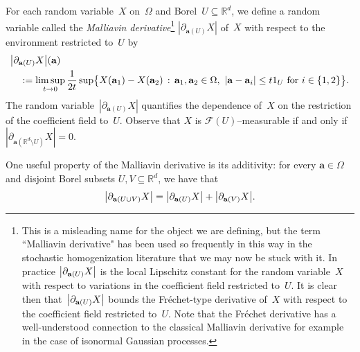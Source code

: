 \documentclass[11pt]{article} %
\numberwithin{equation}{section}
\theoremstyle{definition}
\let\originalleft\left
\let\originalright\right
\renewcommand{\left}{\mathopen{}\mathclose\bgroup\originalleft}
\renewcommand{\right}{\aftergroup\egroup\originalright}
\newcommand*{\Rd}{\ensuremath{\mathbb{R}^d}}
\renewcommand{\a}{\mathbf{a}}
\newcommand{\F}{\mathcal{F}}
\newcommand{\indc}{1}
\begin{document}
For each random variable~$X$ on~$\Omega$ and Borel~$U\subseteq\Rd$, we define a random variable called the \emph{Malliavin derivative}\footnote{This is a misleading name for the object we are defining, but the term ``Malliavin derivative" has been used so frequently in this way in the stochastic homogenization literature that we may now be stuck with it. In practice $\left| \partial_{\a(U)} X \right|$ is the local Lipschitz constant for the random variable~$X$ with respect to variations in the coefficient field restricted to~$U$. It is clear then that~$\left| \partial_{\a(U)} X \right|$ bounds the Fr\'echet-type derivative of~$X$ with respect to the coefficient field restricted to~$U$. Note that the Fr\'echet derivative has a well-understood connection to the classical Malliavin derivative for example in the case of isonormal Gaussian processes.}  
$|\partial_{\a(U)} X|$ of~$X$ with respect to the environment restricted to~$U$ by 
\begin{align} 
\label{e.Mall}
\lefteqn{
\left| \partial_{\a(U)} X\right| (\a) 
} \quad & 
\notag \\ & 
:=
\limsup_{t\to 0} 
\frac1{2t} 
\sup
\bigl\{ X(\a_1) - X(\a_2) 
\,:\,
\a_1,\a_2 \in\Omega, \ \left| \a - \a_i \right| \leq t \indc_{U} \ \mbox{for} \ i\in\{1,2\}
\bigr\}.
\end{align}
The random variable~$|\partial_{\a(U)}X|$ quantifies the dependence of~$X$ on the restriction of the coefficient field to~$U$. Observe that $X$ is $\F(U)$--measurable if and only if $|\partial_{\a(\Rd\setminus U)} X| = 0$. 

\smallskip

One useful property of the Malliavin derivative is its additivity: for every $\a\in\Omega$ and disjoint Borel subsets $U,V\subseteq \Rd$, we have that 
\begin{equation}
\label{e.malliavin.additivity}
\left| \partial_{\a(U\cup V)} X \right| 
= 
\left| \partial_{\a(U)} X \right| 
+
\left| \partial_{\a(V)} X  \right|.
\end{equation}
\end{document}
